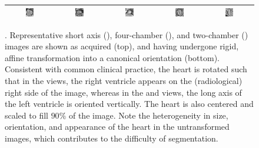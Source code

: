 \begin{figure}
\begin{center}
\begin{tabular}{ccccc}
\includegraphics[width=0.19\textwidth]{./data/ohm/control/HCMNet_1100594/00_SAX/35_/im_t.png} &
\includegraphics[width=0.19\textwidth]{./data/ohm/control/HCMNet_1100823/00_SAX/33_/im_t.png} &
\includegraphics[width=0.19\textwidth]{./data/ohm/control/HCMNet_2600035/00_SAX/024_SA_CINE/im_t.png} &
\includegraphics[width=0.19\textwidth]{./data/ohm/control/HCMNet_1700012/01_HLA/00/im_t.png} &
\includegraphics[width=0.19\textwidth]{./data/ohm/control/HCMNet_2100096/02_VLA/00/im_t.png} \\
\bottomrule

\end{tabular}

\caption[\captiontitle]{\captiontitle{}.
Representative short axis (\SA{}), four-chamber (\HLA{}), and two-chamber (\VLA{}) images are shown as acquired (top), and having undergone rigid, affine transformation into a canonical orientation (bottom).
Consistent with common clinical practice, the heart is rotated such that in the \SA{} views, the right ventricle appears on the (radiological) right side of the image, whereas in the \HLA{} and \VLA{} views, the long axis of the left ventricle is oriented vertically.
The heart is also centered and scaled to fill $90\%$ of the image.
Note the heterogeneity in size, orientation, and appearance of the heart in the untransformed images, which contributes to the difficulty of segmentation.
}
\label{fig:canonical-orientation}
\end{center}
\end{figure}
